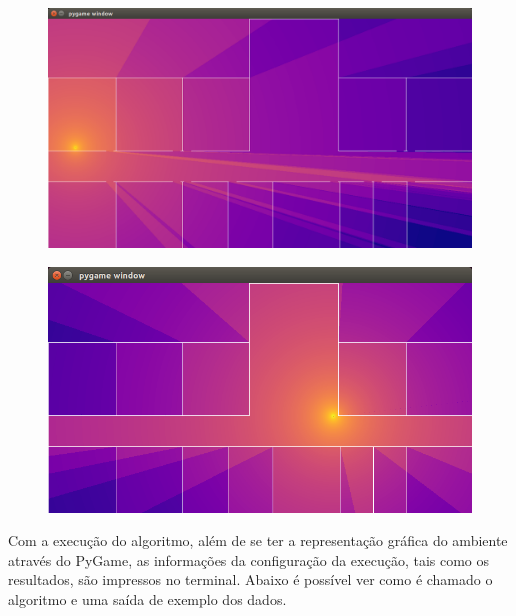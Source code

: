 \documentclass[
	12pt,				%
	twoside,			%
	a4paper,			%
	english,			%
	french,				%
	spanish,			%
	brazil				%
	]{abntex2}
\begin{document}
\begin{figure}[htb]
\begin{minipage}{0.4\textwidth}
    \end{minipage}
    \hfill
    \begin{minipage}{0.4\textwidth}
        \centering \label{captura_3}
        \includegraphics[scale=0.188]{imagens/captura-3.jpg}
    \end{minipage}
    \hfill
    \begin{minipage}{0.4\textwidth}
        \centering \label{captura_4}
        \includegraphics[scale=0.28]{imagens/captura-4.jpg}
    \end{minipage}

\end{figure}

Com a execução do algoritmo, além de se ter a representação gráfica do
ambiente através do PyGame, as informações da configuração da execução,
tais como os resultados, são impressos no terminal. Abaixo é possível
ver como é chamado o algoritmo e uma saída de exemplo dos dados.
\end{document}
